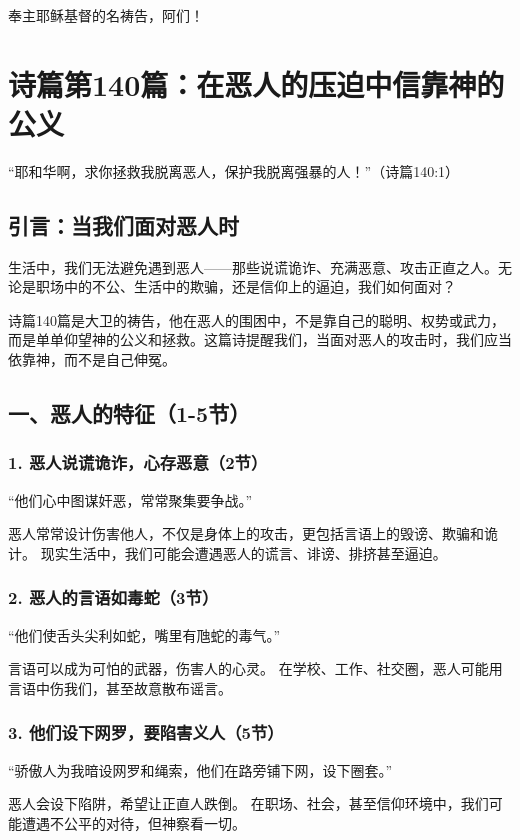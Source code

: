 \documentclass[a4paper, 12pt]{article}
\begin{document}
奉主耶稣基督的名祷告，阿们！
\newpage
\section{诗篇第140篇：在恶人的压迫中信靠神的公义}


“耶和华啊，求你拯救我脱离恶人，保护我脱离强暴的人！”（诗篇140:1）

\subsection*{引言：当我们面对恶人时}
\hspace{0.6cm}生活中，我们无法避免遇到恶人——那些说谎诡诈、充满恶意、攻击正直之人。无论是职场中的不公、生活中的欺骗，还是信仰上的逼迫，我们如何面对？

诗篇140篇是大卫的祷告，他在恶人的围困中，不是靠自己的聪明、权势或武力，而是单单仰望神的公义和拯救。这篇诗提醒我们，当面对恶人的攻击时，我们应当依靠神，而不是自己伸冤。

\subsection*{一、恶人的特征（1-5节）}
\subsubsection*{1. 恶人说谎诡诈，心存恶意（2节）}
“他们心中图谋奸恶，常常聚集要争战。”

恶人常常设计伤害他人，不仅是身体上的攻击，更包括言语上的毁谤、欺骗和诡计。
现实生活中，我们可能会遭遇恶人的谎言、诽谤、排挤甚至逼迫。
\subsubsection*{2. 恶人的言语如毒蛇（3节）}
“他们使舌头尖利如蛇，嘴里有虺蛇的毒气。”

言语可以成为可怕的武器，伤害人的心灵。
在学校、工作、社交圈，恶人可能用言语中伤我们，甚至故意散布谣言。
\subsubsection*{3. 他们设下网罗，要陷害义人（5节）}
“骄傲人为我暗设网罗和绳索，他们在路旁铺下网，设下圈套。”

恶人会设下陷阱，希望让正直人跌倒。
在职场、社会，甚至信仰环境中，我们可能遭遇不公平的对待，但神察看一切。
\end{document}
